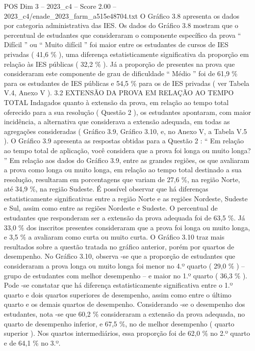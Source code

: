 \begin{textsample}{POS Dim 3 – 2023\_c4 – Score 2.00 – 2023\_c4/enade\_2023\_farm\_a515e48704.txt}
O Gráfico 3.8 apresenta os dados por categoria administrativa das IES.
Os dados do Gráfico 3.8 mostram que o percentual de estudantes que consideraram o componente específico da prova “ Difícil ” ou “ Muito difícil ” foi maior entre os estudantes de cursos de IES privadas ( 41,6 \% ), uma diferença estatisticamente significativa da proporção em relação às IES públicas ( 32,2 \% ).
Já a proporção de presentes na prova que consideraram este componente de grau de dificuldade “ Médio ” foi de 61,9 \% para os estudantes de IES públicas e 54,5 \% para os de IES privadas ( ver Tabela V.4, Anexo V ). 3.2 EXTENSÃO DA PROVA EM RELAÇÃO AO TEMPO TOTAL Indagados quanto à extensão da prova, em relação ao tempo total oferecido para a sua resolução ( Questão 2 ), os estudantes apontaram, com maior incidência, a alternativa que considerava a extensão adequada, em todas as agregações consideradas ( Gráfico 3.9, Gráfico 3.10, e, no Anexo V, a Tabela V.5 ).
O Gráfico 3.9 apresenta as respostas obtidas para a Questão 2 : “ Em relação ao tempo total de aplicação, você considera que a prova foi longa ou muito longa? ” Em relação aos dados do Gráfico 3.9, entre as grandes regiões, os que avaliaram a prova como longa ou muito longa, em relação ao tempo total destinado a sua resolução, resultaram em porcentagens que variam de 27,6 \%, na região Norte, até 34,9 \%, na região Sudeste.
É possível observar que há diferenças estatisticamente significativas entre a região Norte e as regiões Nordeste, Sudeste e Sul, assim como entre as regiões Nordeste e Sudeste.
O percentual de estudantes que responderam ser a extensão da prova adequada foi de 63,5 \%.
Já 33,0 \% dos inscritos presentes consideraram que a prova foi longa ou muito longa, e 3,5 \% a avaliaram como curta ou muito curta.
O Gráfico 3.10 traz mais resultados sobre a questão tratada no gráfico anterior, porém por quartos de desempenho.
No Gráfico 3.10, observa -se que a proporção de estudantes que consideraram a prova longa ou muito longa foi menor no 4.º quarto ( 29,0 \% ) – grupo de estudantes com melhor desempenho – e maior no 1.º quarto ( 36,3 \% ).
Pode -se constatar que há diferença estatisticamente significativa entre o 1.º quarto e dois quartos superiores de desempenho, assim como entre o último quarto e os demais quartos de desempenho.
Considerando -se o desempenho dos estudantes, nota -se que 60,2 \% consideraram a extensão da prova adequada, no quarto de desempenho inferior, e 67,5 \%, no de melhor desempenho ( quarto superior ).
Nos quartos intermediários, essa proporção foi de 62,0 \% no 2.º quarto e de 64,1 \% no 3.º.

\end{textsample}
